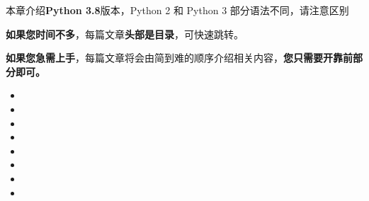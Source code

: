 
\begin{issues}
\issueTODO
\end{issues}

本章介绍\textbf{Python 3.8}版本，Python 2 和 Python 3 部分语法不同，请注意区别

\textbf{如果您时间不多}，每篇文章\textbf{头部是目录}，可快速跳转。

\textbf{如果您急需上手}，每篇文章将会由简到难的顺序介绍相关内容，\textbf{您只需要开靠前部分即可。}

\begin{itemize}
\item {}
\item {}
\item {}
\item {}
\item {}
\item {}
\item {}
\item {}
\end{itemize}

